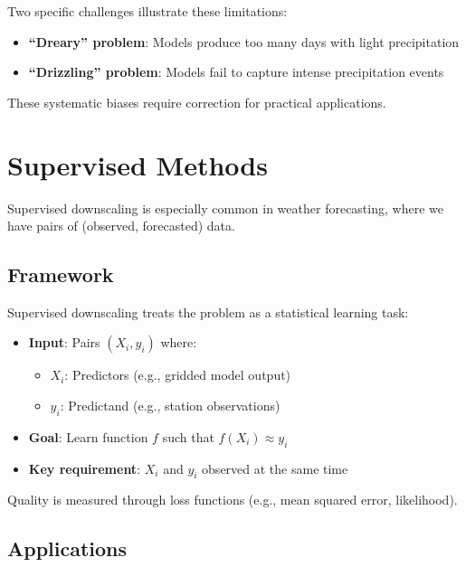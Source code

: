 \documentclass[
  letterpaper,
  DIV=11,
  numbers=noendperiod]{scrreprt}
\providecommand{\tightlist}{%
  \setlength{\itemsep}{0pt}\setlength{\parskip}{0pt}}
\begin{document}
Two specific challenges illustrate these limitations:

\begin{itemize}
\tightlist
\item
  \textbf{``Dreary'' problem}: Models produce too many days with light
  precipitation
\item
  \textbf{``Drizzling'' problem}: Models fail to capture intense
  precipitation events
\end{itemize}

These systematic biases require correction for practical applications.

\section{Supervised Methods}\label{supervised-methods}

Supervised downscaling is especially common in weather forecasting,
where we have pairs of (observed, forecasted) data.

\subsection{Framework}\label{framework}

Supervised downscaling treats the problem as a statistical learning
task:

\begin{itemize}
\tightlist
\item
  \textbf{Input}: Pairs \((X_i, y_i)\) where:

  \begin{itemize}
  \tightlist
  \item
    \(X_i\): Predictors (e.g., gridded model output)
  \item
    \(y_i\): Predictand (e.g., station observations)
  \end{itemize}
\item
  \textbf{Goal}: Learn function \(f\) such that \(f(X_i) \approx y_i\)
\item
  \textbf{Key requirement}: \(X_i\) and \(y_i\) observed at the same
  time
\end{itemize}

Quality is measured through loss functions (e.g., mean squared error,
likelihood).

\subsection{Applications}\label{applications-2}
\end{document}

